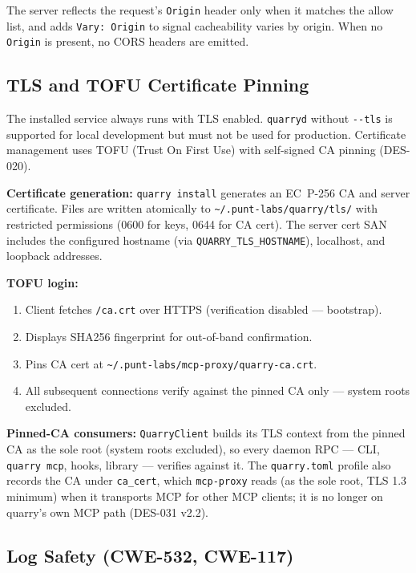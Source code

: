 \documentclass[a4paper,10pt]{article}
\begin{document}
The server reflects the request's \texttt{Origin} header only when it
matches the allow list, and adds \texttt{Vary: Origin} to signal
cacheability varies by origin.  When no \texttt{Origin} is present,
no CORS headers are emitted.

\subsection{TLS and TOFU Certificate Pinning}

The installed service always runs with TLS enabled.  \texttt{quarryd}
without \texttt{-{}-tls} is supported for local development but
must not be used for production.  Certificate management uses TOFU
(Trust On First Use) with self-signed CA pinning (DES-020).

\textbf{Certificate generation:} \texttt{quarry install} generates
an EC~P-256 CA and server certificate.  Files are written atomically
to \texttt{\~{}/.punt-labs/quarry/tls/} with restricted permissions
(0600 for keys, 0644 for CA cert).  The server cert SAN includes the
configured hostname (via \texttt{QUARRY\_TLS\_HOSTNAME}), localhost,
and loopback addresses.

\textbf{TOFU login:}
\begin{enumerate}
  \item Client fetches \texttt{/ca.crt} over HTTPS (verification
    disabled --- bootstrap).
  \item Displays SHA256 fingerprint for out-of-band confirmation.
  \item Pins CA cert at
    \texttt{\~{}/.punt-labs/mcp-proxy/quarry-ca.crt}.
  \item All subsequent connections verify against the pinned CA only
    --- system roots excluded.
\end{enumerate}

\textbf{Pinned-CA consumers:} \texttt{QuarryClient} builds its TLS
context from the pinned CA as the sole root (system roots excluded), so
every daemon RPC --- CLI, \texttt{quarry mcp}, hooks, library --- verifies
against it.  The \texttt{quarry.toml} profile also records the CA under
\texttt{ca\_cert}, which \texttt{mcp-proxy} reads (as the sole root, TLS
1.3 minimum) when it transports MCP for other MCP clients; it is no longer
on quarry's own MCP path (DES-031 v2.2).

\subsection{Log Safety (CWE-532, CWE-117)}
\end{document}
